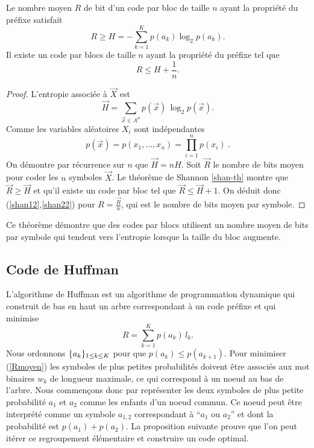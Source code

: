 \begin{proposition}
\label{shan-prop}
Le nombre moyen $R$ de bit d'un code
par bloc de taille $n$ ayant la propri\'et\'e du
pr\'efixe satisfait
\begin{equation}
\label{shan12}
R \geq H = - \sum_{k=1}^K p(a_k) \log_2 p(a_k) .
\end{equation}
Il existe un code par blocs de taille
$n$ ayant la propri\'et\'e du pr\'efixe tel que
\begin{equation}
\label{shan22}
R \leq H + \frac 1 n.
\end{equation}
\end{proposition}
\begin{proof}
L'entropie associ\'ee \`a $\vec X$ est
\[
\vec H = \sum_{\vec x \in A^n} p(\vec x) \, \log_2 p(\vec x) .
\]
Comme les variables al\'eatoires $X_i$ sont ind\'ependantes
\[
p(\vec x) = p(x_1, \dots , x_n) = \prod_{i=1}^n p(x_i)~.
\]
On d\'emontre par r\'ecurrence sur $n$ que
$\vec H = n H$. Soit $\vec R$ le nombre de bits moyen
pour coder les $n$ symboles $\vec X$. Le th\'eor\`eme
de Shannon \ref{shan-th} montre que $\vec R \geq \vec H$
et qu'il existe un code par bloc tel que
$\vec R \leq \vec H + 1$. On d\'eduit donc
(\ref{shan12},\ref{shan22}) pour $R = \frac{\vec R} n$, qui
est le nombre de bits moyen par symbole.
\end{proof}

Ce th\'eor\`eme d\'emontre que des codes par blocs
utilisent un nombre moyen de bits par symbole qui tendent
vers l'entropie lorsque la taille du bloc augmente.

\subsection{Code de Huffman}
L'algorithme de Huffman est un algorithme de programmation dynamique
qui construit de bas en haut un arbre correspondant \`a un
code pr\'efixe et qui
minimise
\begin{equation}
\label{Rmoyen}
R = \sum_{k=1}^K p(a_k) \, l_k .
\end{equation}
Nous ordonnons
$\{a_k \}_{ 1 \leq k \leq K}$ pour que $p(a_k) \leq p(a_{k+1})$.
Pour minimiser (\ref{Rmoyen})
les symboles de plus petites probabilit\'es doivent \^etre
associ\'es aux mot binaires $w_k$ de longueur maximale, ce qui
correspond \`a un noeud au bas de l'arbre.
Nous commen\c cons donc par repr\'esenter les deux symboles de plus
petite probabilit\'e
$a_1$ et $a_2$ comme les enfants d'un noeud commun.
Ce noeud peut \^etre interpr\'et\'e comme un symbole
$a_{1,2}$ correspondant \`a ``$a_1$ ou $a_2$'' et
dont la probabilit\'e est
$p(a_1) + p(a_2)$. La proposition suivante prouve que
l'on peut it\'erer ce regroupement \'el\'ementaire et construire un
code optimal.

